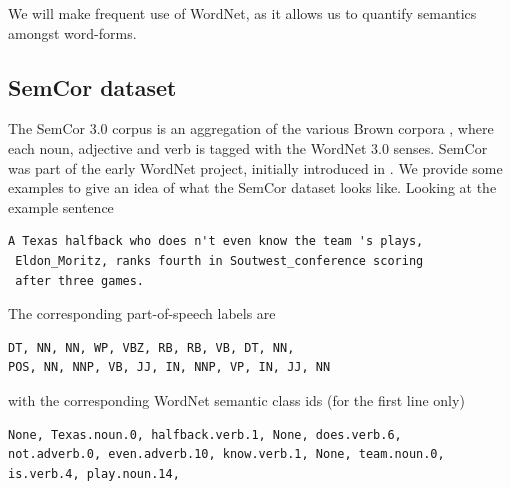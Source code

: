 \documentclass[a4paper,12pt,oneside,openright]{report}
\begin{document}
We will make frequent use of WordNet, as it allows us to quantify semantics amongst word-forms.

\subsection{SemCor dataset}

The SemCor 3.0 corpus is an aggregation of the various Brown corpora \cite{francis64}, where each noun, adjective and verb is tagged with the WordNet 3.0 senses.
SemCor was part of the early WordNet project, initially introduced in \cite{miller94}.
We provide some examples to give an idea of what the SemCor dataset looks like.
Looking at the example sentence

\begin{tcolorbox}
\begin{verbatim}
A Texas halfback who does n't even know the team 's plays,
 Eldon_Moritz, ranks fourth in Soutwest_conference scoring 
 after three games.
\end{verbatim}
\end{tcolorbox}

The corresponding part-of-speech labels are

\begin{tcolorbox}
\begin{verbatim}
DT, NN, NN, WP, VBZ, RB, RB, VB, DT, NN, 
POS, NN, NNP, VB, JJ, IN, NNP, VP, IN, JJ, NN
\end{verbatim}
\end{tcolorbox}

with the corresponding WordNet semantic class ids (for the first line only)

\begin{tcolorbox}
\begin{verbatim}
None, Texas.noun.0, halfback.verb.1, None, does.verb.6,
not.adverb.0, even.adverb.10, know.verb.1, None, team.noun.0,
is.verb.4, play.noun.14,
\end{verbatim}
\end{tcolorbox}
\end{document}
